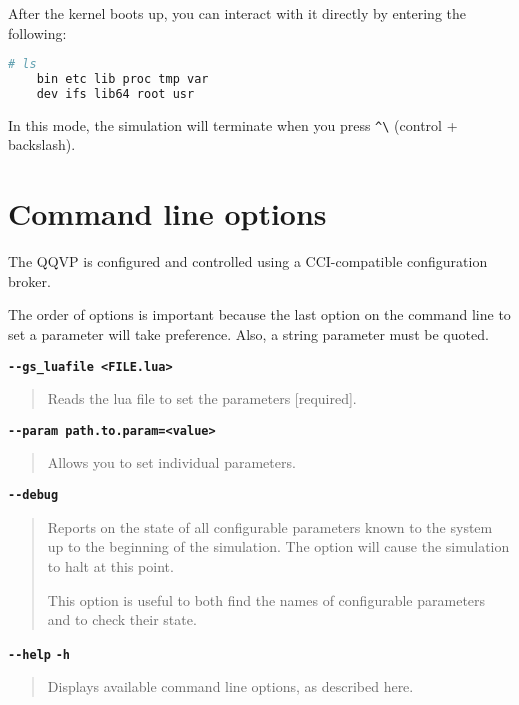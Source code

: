 After the kernel boots up, you can interact with it directly by entering the following:

\small
\begin{lstlisting}[language=bash]
    # ls
    bin etc lib proc tmp var
    dev ifs lib64 root usr
\end{lstlisting}
\normalsize

\note In this mode, the simulation will terminate when you press {\small{\lstinline!^\!}} (control + backslash).


\clearpage
\section{Command line options}
\label{sec:cliOptions}

The QQVP is configured and controlled using a CCI-compatible configuration broker.

The order of options is important because the last option on the command line to set a parameter will take preference. Also, a string parameter must be quoted.

{\textbf {\footnotesize{\lstinline!--gs_luafile <FILE.lua>!}}}
\vspace{-2pt}
\begin{quote}
Reads the lua file to set the parameters [required].
\end{quote}

{\textbf {\footnotesize{\lstinline!--param path.to.param=<value>!}}}
\vspace{-2pt}
\begin{quote}
Allows you to set individual parameters.
\end{quote}

{\textbf {\footnotesize{\lstinline!--debug!}}}
\vspace{-2pt}
\begin{quote}
Reports on the state of all configurable parameters known to the system up to the beginning of the simulation. The option will cause the simulation to halt at this point.

This option is useful to both find the names of configurable parameters and to check their state.
\end{quote}

{\textbf {\footnotesize{\lstinline!--help!}}} \newline
{\textbf {\footnotesize{\lstinline!-h!}}}
\vspace{-2pt}
\begin{quote}
Displays available command line options, as described here.
\end{quote}

